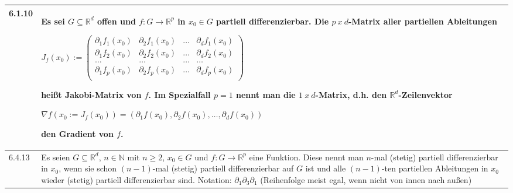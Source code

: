 \begin{table}[H]
\begin{tabularx}{\textwidth}{X m{16cm}}
        \midrule
        6.1.10& Es sei $G \subseteq \mathbb{R}^d$ offen und $f: G \rightarrow \mathbb{R}^p$ in $x_0 \in G$ partiell differenzierbar. 
                Die $p~x~d$-Matrix aller partiellen Ableitungen \hfill \break
                \centerline{$ J_f(x_0) :=   \begin{pmatrix}
                                            \partial_1 f_1(x_0) & \partial_2 f_1(x_0) & \dots & \partial_d f_1(x_0) \\
                                            \partial_1 f_2(x_0) & \partial_2 f_2(x_0) & \dots & \partial_d f_2(x_0) \\
                                            \dots & \dots & \dots & \dots \\
                                            \partial_1 f_p(x_0) & \partial_2 f_p(x_0) & \dots & \partial_d f_p(x_0) \\
                                            \end{pmatrix}$} 
                heißt \textbf{Jakobi-Matrix} von $f$. \hfill \break
                Im Spezialfall $p=1$ nennt man die $1~x~d$-Matrix, d.h. den $\mathbb{R}^d$-Zeilenvektor \hfill \break
                \centerline{$\nabla f(x_0 := J_f(x_0)) = (\partial_1 f(x_0), \partial_2f(x_0), \dots, \partial_df(x_0))$}
                den \textbf{Gradient} von $f$. \\
        \midrule
        6.4.13& Es seien $G \subseteq \mathbb{R}^d$, $n \in \mathbb{N}$ mit $n \geq 2$, $x_0 \in G$ und $f: G \rightarrow \mathbb{R}^p$ eine Funktion.
                Diese nennt man $n$-mal (stetig) partiell differenzierbar in $x_0$, wenn sie schon $(n-1)$-mal (stetig) partiell differenzierbar
                auf $G$ ist und alle $(n-1)$-ten partiellen Ableitungen in $x_0$ wieder (stetig) partiell differenzierbar sind.  \hfill \break
                Notation: $\partial_1 \partial_3 \partial_1$ (Reihenfolge meist egal, wenn nicht von innen nach außen) \\

        \bottomrule

    \end{tabularx}
    \end{table}

